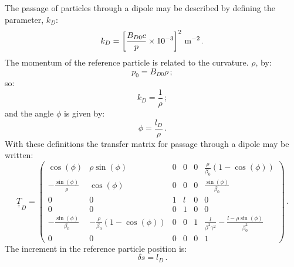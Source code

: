 The passage of particles through a dipole may be described by defining
the parameter, $k_D$:
\begin{equation}
  k_D = \left[ \frac{B_{D0} c}{p} \times 10^{-3} \right]^2\, {\rm m}^{-2} \, .
  \label{Eq:EffectivekD}
\end{equation}
The momentum of the reference particle is related to the
curvature. $\rho$, by:
\begin{equation}
  p_0 = B_{D0} \rho \, ;
\end{equation}
so:
\begin{equation}
  k_D = \frac{1}{\rho} \, ; 
\end{equation}
and the angle $\phi$ is given by:
\begin{equation}
  \phi = \frac{l_D}{\rho} \, .
\end{equation}
With these definitions the transfer matrix for passage through a
dipole may be written:
\begin{equation}
  \underline{\underline{T}}_{D} =
    \begin{pmatrix}
                    \cos(\phi) &                                  \rho \sin(\phi) & 0 & 0 & 0 &                 \frac{\rho}{\beta_0}\left(1 - \cos(\phi) \right) \\
      -\frac{\sin(\phi)}{\rho} &                                       \cos(\phi) & 0 & 0 & 0 &                                       \frac{\sin(\phi)}{\beta_0} \\
                             0 &                                                0 & 1 & l & 0 &                                                                0 \\
                             0 &                                                0 & 0 & 1 & 0 &                                                                0 \\
   -\frac{\sin(\phi)}{\beta_0} &  -\frac{\rho}{\beta_0}\left(1 -\cos(\phi)\right) & 0 & 0 & 1 & \frac{l}{\beta^2 \gamma^2} - \frac{l - \rho\sin(\phi)}{\beta_0^2} \\
                             0 &                                                0 & 0 & 0 & 0 &                                                                1
        \end{pmatrix} \, .
\end{equation}
The increment in the reference particle position is:
\begin{equation}
  \delta s = l_D \, .
\end{equation}


